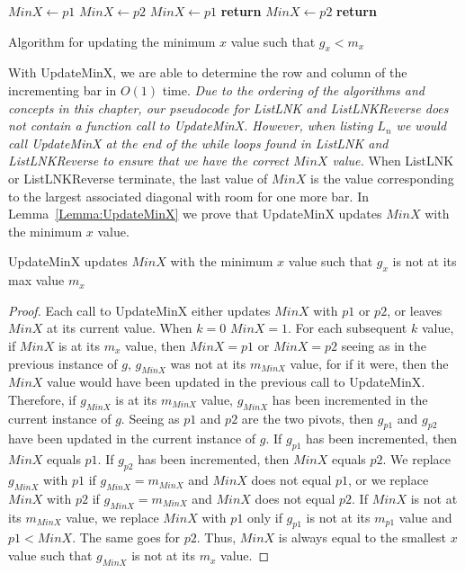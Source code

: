 \begin{algorithm}
  \begin{algorithmic}[1]
        \State $MinX \gets p1$
      \EndIf 
        \State $MinX \gets p2$ 
      \EndIf 
          \State $MinX \gets p1$
          \textbf{return}
        \EndIf
          \State $MinX \gets p2$
          \textbf{return}
        \EndIf
      \EndIf
    \EndFunction
  \end{algorithmic}
  \caption{Algorithm for updating the minimum $x$ value such that $g_{x}<m_{x}$}
  \label{Alg:UpdateMinX}
\end{algorithm}
With {\sc UpdateMinX}, we are able to determine the row and column of the incrementing bar in $O(1)$ time. 
\emph{Due to the ordering of the algorithms and concepts in this chapter, our 
pseudocode for {\sc ListLNK} and {\sc ListLNKReverse} does not contain a function call to {\sc UpdateMinX}. However, when listing $L_{n}$ 
we would call {\sc UpdateMinX} at the end of the while loops found in {\sc ListLNK} and {\sc ListLNKReverse} to ensure 
that we have the correct $MinX$ value.} When {\sc ListLNK} or {\sc ListLNKReverse} terminate, the last value 
of $MinX$ is the value corresponding to the largest associated diagonal with room for one more bar. 
In Lemma~\ref{Lemma:UpdateMinX} we prove that {\sc UpdateMinX} updates $MinX$ with the minimum $x$ value. 
\begin{lemma}
  {\sc UpdateMinX} updates $MinX$ with the minimum $x$ value such that $g_{x}$ is not at its max value $m_{x}$
  \label{Lemma:UpdateMinX}
\end{lemma}
\begin{proof}
 Each call to {\sc UpdateMinX} either updates $MinX$ with $p1$ or $p2$, or leaves $MinX$ at its current value. When $k=0$ 
 $MinX=1$. For each subsequent $k$ value, if $MinX$ is at its $m_{x}$ value, then $MinX=p1$ or $MinX=p2$ seeing as in the previous 
 instance of $g$, $g_{MinX}$ was not at its $m_{MinX}$ value, for if it were, then the $MinX$ value would have been updated in the previous 
 call to {\sc UpdateMinX}. Therefore, if $g_{MinX}$ is at its $m_{MinX}$ value, $g_{MinX}$ has been incremented in the current instance of 
 $g$. Seeing as $p1$ and $p2$ are the two pivots, then $g_{p1}$ and $g_{p2}$ have been updated in the current instance of $g$. 
 If $g_{p1}$ has been incremented, then $MinX$ equals $p1$. If $g_{p2}$ has been incremented, then $MinX$ equals $p2$. We replace 
 $g_{MinX}$ with $p1$ if $g_{MinX}=m_{MinX}$ and $MinX$ does not equal $p1$, or we replace $MinX$ with $p2$ if $g_{MinX}=m_{MinX}$ 
 and $MinX$ does not equal $p2$. If $MinX$ is not at its $m_{MinX}$ value, we replace $MinX$ with $p1$ only if $g_{p1}$ is not 
 at its $m_{p1}$ value and $p1<MinX$. The same goes for $p2$. Thus, $MinX$ is always equal to the smallest $x$ value such that $g_{MinX}$ 
 is not at its $m_{x}$ value.  
\end{proof}

